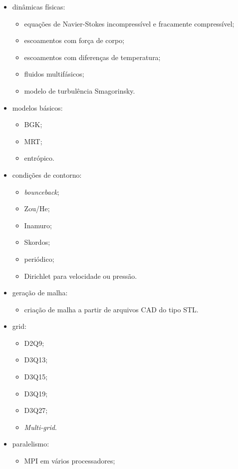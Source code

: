 \begin{itemize}
  \item dinâmicas físicas:
  \begin{itemize}
     \item equações de Navier-Stokes incompressível e fracamente compressível;
     \item escoamentos com força de corpo;
     \item escoamentos com diferenças de temperatura;
     \item fluidos multifásicos;
     \item modelo de turbulência Smagorinsky.
   \end{itemize}
  \item modelos básicos:
  \begin{itemize}
    \item BGK;
    \item MRT;
    \item entrópico.
  \end{itemize}
  \item condições de contorno:
  \begin{itemize}
    \item \textit{bounceback};
    \item Zou/He;
    \item Inamuro;
    \item Skordos;
    \item periódico;
    \item Dirichlet para velocidade ou pressão.
  \end{itemize}
  \item geração de malha:
  \begin{itemize}
    \item criação de malha a partir de arquivos CAD do tipo STL.  
  \end{itemize}
  \item grid:
  \begin{itemize}
    \item D2Q9;
    \item D3Q13;
    \item D3Q15;
    \item D3Q19;
    \item D3Q27;
    \item \textit{Multi-grid}. 
  \end{itemize}
  \item paralelismo:
  \begin{itemize}
    \item MPI em vários processadores;

\end{itemize}
\end{itemize}
